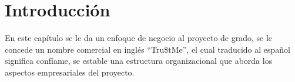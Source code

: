 \section{Introducción}

{En este capítulo se le da un enfoque de negocio al proyecto de grado, se le concede un nombre comercial en inglés “Tru\$tMe”, el cual traducido al español significa confíame, se estable una estructura organizacional que aborda los aspectos empresariales del proyecto.}